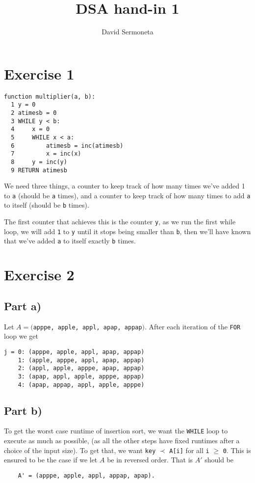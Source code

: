\documentclass{article}
\title{DSA hand-in 1}
\author{David Sermoneta}
\begin{document}
\maketitle
\section*{Exercise 1}
\begin{lstlisting}
function multiplier(a, b):                                     
  1 y = 0
  2 atimesb = 0
  3 WHILE y < b:
  4     x = 0
  5     WHILE x < a:
  6         atimesb = inc(atimesb)
  7         x = inc(x)
  8     y = inc(y)        
  9 RETURN atimesb
\end{lstlisting}
We need three things, a counter to keep track of how 
many times we've added 1 to \texttt{a} (should be \texttt{a} times),
and a counter to keep
track of how many times to add \texttt{a} to itself (should be \texttt{b} times).

The first counter that achieves this is the 
counter \texttt{y}, as we run the first while loop, we will
add \texttt{1} to \texttt{y} until it stops being smaller than \texttt{b}, then 
we'll have known that we've added \texttt{a} to itself exactly \texttt{b} times.
\newpage
\section*{Exercise 2}
\subsection*{Part a)}
Let $A = ($\texttt{apppe, apple, appl, apap, 
appap}$)$. After each iteration of the \texttt{FOR} loop
we get 
 \begin{lstlisting}
j = 0: (apppe, apple, appl, apap, appap)
    1: (apple, apppe, appl, apap, appap)
    2: (appl, apple, apppe, apap, appap)
    3: (apap, appl, apple, apppe, appap)
    4: (apap, appap, appl, apple, apppe)
\end{lstlisting}

\subsection*{Part b)}
To get the worst case runtime of insertion sort,
we want the \texttt{WHILE} loop to execute as much 
as possible, (as all the other steps have fixed
runtimes after a choice of the input size). To get that, 
we want \texttt{key} $\prec$ \texttt{A[i]} for all 
\texttt{i}  $\geq $ \texttt{0}. This is ensured to be the
case if we let $A$ be in reversed order. That is $A'$ should be 
\begin{lstlisting}
    A' = (apppe, apple, appl, appap, apap).
\end{lstlisting}
\end{document}

